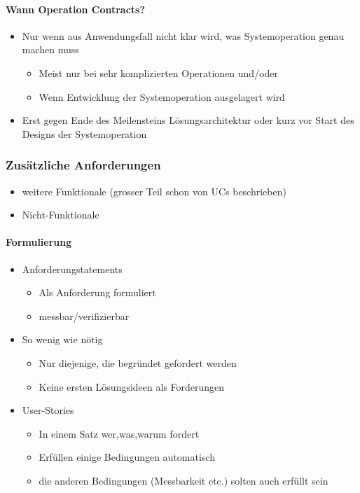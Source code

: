 \documentclass[../ZF_SWEN1.tex]{subfiles}
\begin{document}
\paragraph{Wann Operation Contracts?}
\begin{itemize}
	\item Nur wenn aus Anwendungsfall nicht klar wird, was Systemoperation genau machen muss
	\begin{itemize}
		\item Meist nur bei sehr komplizierten Operationen und/oder
		\item Wenn Entwicklung der Systemoperation ausgelagert wird
	\end{itemize}
	\item Erst gegen Ende des Meilensteins Lösungsarchitektur oder kurz vor Start des Designs der Systemoperation
\end{itemize}


\subsubsection{Zusätzliche Anforderungen}

\begin{itemize}
	\item weitere Funktionale (grosser Teil schon von UCs beschrieben)
	\item Nicht-Funktionale
\end{itemize}


\paragraph{Formulierung}

\begin{itemize}
	\item Anforderungstatements
	\begin{itemize}
		\item Als Anforderung formuliert
		\item messbar/verifizierbar
	\end{itemize}
	\item So wenig wie nötig
	\begin{itemize}
		\item Nur diejenige, die begründet gefordert werden
		\item Keine ersten Lösungsideen als Forderungen
	\end{itemize}
	\item User-Stories
	\begin{itemize}
		\item In einem Satz wer,was,warum fordert
		\item Erfüllen einige Bedingungen automatisch
		\item die anderen Bedingungen (Messbarkeit etc.) solten auch erfüllt sein
	\end{itemize}
\end{itemize}
\end{document}
